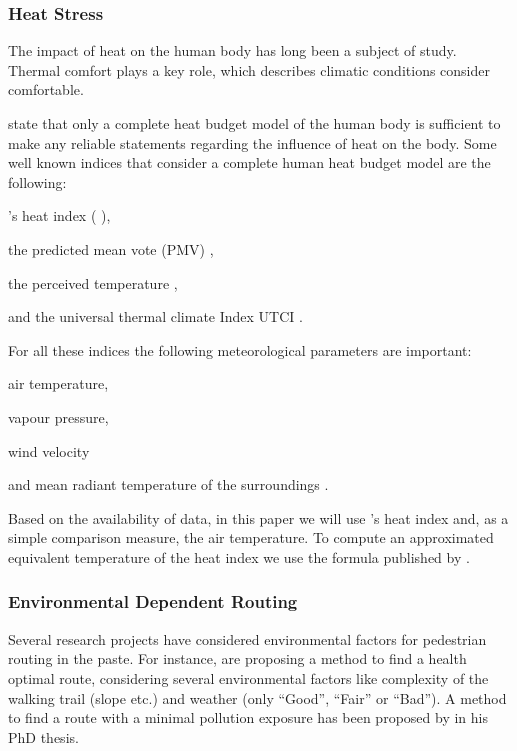 \subsubsection{Heat Stress}
The impact of heat on the human body has long been a subject of study. Thermal comfort plays a key role, which describes climatic conditions consider comfortable. 

\textcite{Staiger1997} state that only a complete heat budget model of the human body is sufficient to make any reliable statements regarding the influence of heat on the body. Some well known indices that consider a complete human heat budget model are the following:
\begin{inparaenum}[(1)]
  \item \citeauthor{Steadman1979}'s heat index (\citeauthor{Steadman1979} \citeyear*{Steadman1979}\citeyear*{Steadman1979a}),
  \item the predicted mean vote (PMV) \parencite{Fanger1973},
  \item the perceived temperature \parencite{Staiger1997,Jendritzky2000},
  \item and the universal thermal climate Index UTCI \parencite{Jendritzky2010}.
\end{inparaenum}

For all these indices the following meteorological parameters are important:
\begin{inparaenum}[(1)]
\item air temperature,
\item vapour pressure,
\item wind velocity 
\item and mean radiant temperature of the surroundings \parencite{Matzarakis1999}.
\end{inparaenum}

Based on the availability of data, in this paper we will use \citeauthor{Steadman1979}'s heat index \parencite{Steadman1979} and, as a simple comparison measure, the air temperature. To compute an approximated equivalent temperature of the heat index we use the formula published by \textcite[77]{Stull2011}.  

\subsubsection{Environmental Dependent Routing}
Several research projects have considered environmental factors for pedestrian routing in the paste. For instance, \textcite{Sharker2012} are proposing a method to find a health optimal route, considering several environmental factors like complexity of the walking trail (slope etc.) and weather (only “Good”, “Fair” or “Bad”). A method to find a route with a minimal pollution exposure has been proposed by \textcite{Hasenfratz2015} in his PhD thesis.

